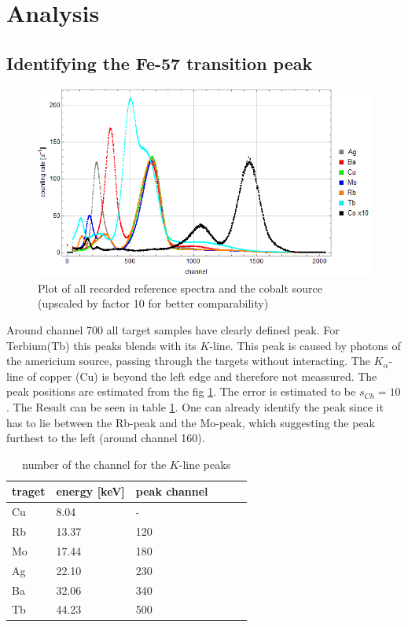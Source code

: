\section{Analysis}
\subsection{Identifying the Fe-57 transition peak}
\begin{figure}[H]
\centering
\includegraphics[width=1\linewidth]{../results/calibration/spectra}
\caption[Reference spectra]{Plot of all recorded reference spectra and the cobalt source (upscaled by factor 10 for better comparability)}
\label{fig:analysis:spectra}
\end{figure}
Around channel 700 all target samples have clearly defined peak. For Terbium(Tb) this peaks blends with its $K$-line. This peak is caused by photons of the americium source, passing through the targets without interacting. The $K_\alpha$-line of copper (Cu) is beyond the left edge and therefore not meassured. The peak positions are estimated from the fig \ref{fig:analysis:spectra}. The error is estimated to be $s_{Ch}=10$. The Result can be seen in table \ref{tb:analysis:peakpos}. One can already identify the peak since it has to lie between the Rb-peak and the Mo-peak, which suggesting the peak furthest to the left (around channel 160).

\begin{table}[H]\centering
	\begin{tabular}{@{}llllll@{}}
		\toprule
		 traget & energy [keV]& peak channel  \\
		\midrule
		Cu & 8.04 & - \\
		Rb & 13.37 & 120 \\
		Mo & 17.44 & 180 \\
		Ag & 22.10 & 230 \\
		Ba & 32.06 & 340 \\
		Tb & 44.23 & 500\\
		\bottomrule
	\end{tabular}
	\caption[peak positions]{number of the channel for the $K$-line peaks}
	\label{tb:analysis:peakpos}
\end{table}

